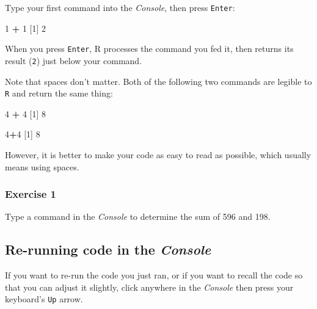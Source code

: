 \documentclass[
]{book}
\newenvironment{Shaded}{\begin{snugshade}}{\end{snugshade}}
\newcommand{\DecValTok}[1]{\textcolor[rgb]{0.00,0.00,0.81}{#1}}
\newcommand{\NormalTok}[1]{#1}
\newcommand{\OperatorTok}[1]{\textcolor[rgb]{0.81,0.36,0.00}{\textbf{#1}}}
\newcommand{\StringTok}[1]{\textcolor[rgb]{0.31,0.60,0.02}{#1}}
\begin{document}
Type your first command into the \emph{Console}, then press \texttt{Enter}:

\begin{Shaded}
\begin{Highlighting}[]
\DecValTok{1} \OperatorTok{+}\StringTok{ }\DecValTok{1}
\NormalTok{[}\DecValTok{1}\NormalTok{] }\DecValTok{2}
\end{Highlighting}
\end{Shaded}

When you press \texttt{Enter}, R processes the command you fed it, then returns its result (\texttt{2}) just below your command.

Note that spaces don't matter. Both of the following two commands are legible to \texttt{R} and return the same thing:

\begin{Shaded}
\begin{Highlighting}[]
\DecValTok{4} \OperatorTok{+}\StringTok{ }\DecValTok{4}
\NormalTok{[}\DecValTok{1}\NormalTok{] }\DecValTok{8}

\DecValTok{4}\OperatorTok{+}\DecValTok{4}
\NormalTok{[}\DecValTok{1}\NormalTok{] }\DecValTok{8}
\end{Highlighting}
\end{Shaded}

However, it is better to make your code as easy to read as possible, which usually means using spaces.

\hypertarget{exercise-1}{%
\subsubsection*{Exercise 1}\label{exercise-1}}

Type a command in the \emph{Console} to determine the sum of 596 and 198.

\hypertarget{re-running-code-in-the-console}{%
\subsection*{\texorpdfstring{Re-running code in the \emph{Console}}{Re-running code in the Console}}\label{re-running-code-in-the-console}}

If you want to re-run the code you just ran, or if you want to recall the code so that you can adjust it slightly, click anywhere in the \emph{Console} then press your keyboard's \texttt{Up} arrow.
\end{document}
